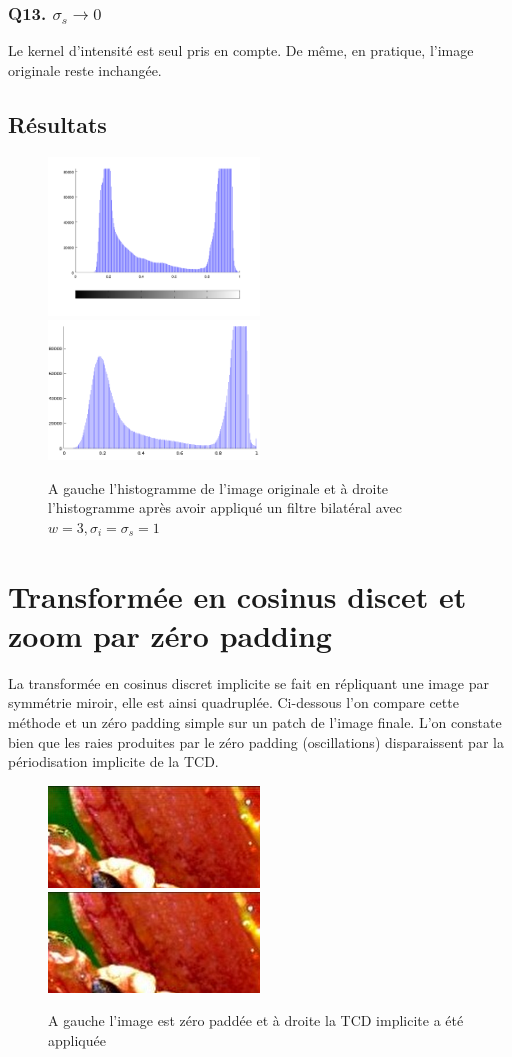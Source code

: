 \documentclass{article}
\begin{document}
\subsubsection*{Q13. $\sigma_s \rightarrow 0 $}
Le kernel d'intensité est seul pris en compte. De même, en pratique, l'image originale reste inchangée.

\newpage
\subsection*{Résultats}

\begin{figure}[h]
	\includegraphics[width=0.5\textwidth]{hist_orig.png}
	\includegraphics[width=0.5\textwidth]{hist_eq.png}
  \caption{A gauche l'histogramme de l'image originale et à droite l'histogramme après avoir appliqué un filtre bilatéral avec $w=3, \sigma_i = \sigma_s = 1$ }
\end{figure}

\section{Transformée en cosinus discet et zoom par zéro padding}
La transformée en cosinus discret implicite se fait en répliquant une image par symmétrie miroir, elle est ainsi quadruplée. Ci-dessous l'on compare cette méthode et un zéro padding simple sur un patch de l'image finale. L'on constate bien que les raies produites par le zéro padding (oscillations) disparaissent par la périodisation implicite de la TCD.

\begin{figure}[h]
	\includegraphics[width=0.50\textwidth]{flowersZerPad.png}
	\includegraphics[width=0.50\textwidth]{flowersTCD.png}
  \caption{A gauche l'image est zéro paddée et à droite la TCD implicite a été appliquée}
\end{figure}
\end{document}
